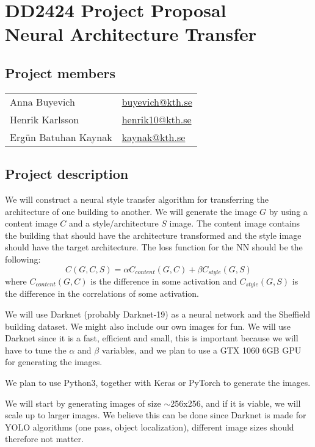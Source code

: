 \documentclass[a4paper, 12pt]{article}
\begin{document}
	\pagestyle{empty}
	\noindent
	\begin{minipage}{\textwidth}
	\section*{DD2424 Project Proposal\vspace{2mm}\\{\huge Neural Architecture Transfer}}
	\subsection*{Project members}
	\begin{tabular}{ll}
		Anna Buyevich& \href{mailto:buyevich@kth.se}{buyevich@kth.se}\\
		Henrik Karlsson& \href{mailto:henrik10@kth.se}{henrik10@kth.se}\\
		Ergün Batuhan Kaynak& \href{mailto:kaynak@kth.se}{kaynak@kth.se}
	\end{tabular}
	\end{minipage}
	
		\subsection*{Project description}
		We will construct a neural style transfer algorithm for transferring the architecture of one building to another. We will generate the image $G$ by using a content image $C$ and a style/architecture $S$ image. The content image contains the building that should have the architecture transformed and the style image should have the target architecture. The loss function for the NN should be the following:
		\[
			C(G,C,S) = \alpha C_{content}(G,C) + \beta C_{style}(G,S)
		\]
		where $C_{content}(G,C)$ is the difference in some activation and $C_{style}(G,S)$ is the difference in the correlations of some activation. 
		
		We will use Darknet (probably Darknet-19) as a neural network and the Sheffield building dataset. We might also include our own images for fun. We will use Darknet since it is a fast, efficient and small, this is important because we will have to tune the $\alpha$ and $\beta$ variables, and we plan to use a GTX 1060 6GB GPU for generating the images.
		
		We plan to use Python3, together with Keras or PyTorch to generate the images.
		
		We will start by generating images of size $\sim$256x256, and if it is viable, we will scale up to larger images. We believe this can be done since Darknet is made for YOLO algorithms (one pass, object localization), different image sizes should therefore not matter.
		
\end{document}
